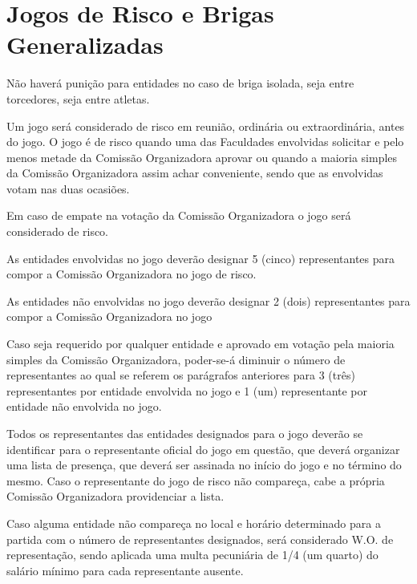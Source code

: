 {\let\clearpage\relax \chapter{Jogos de Risco e Brigas Generalizadas}}

\begin{article}
	Não haverá punição para entidades no caso de briga isolada, seja entre torcedores, seja entre atletas.
\end{article}

\begin{article}
	Um jogo será considerado de risco em reunião, ordinária ou extraordinária, antes do jogo. O jogo é de risco quando uma das Faculdades envolvidas solicitar e pelo menos metade da Comissão Organizadora aprovar ou quando a maioria simples da Comissão Organizadora assim achar conveniente, sendo que as envolvidas votam nas duas ocasiões.

	\begin{xparagraph}
		Em caso de empate na votação da Comissão Organizadora o jogo será considerado de risco.
	\end{xparagraph}

	\begin{xparagraph}
		As entidades envolvidas no jogo deverão designar 5 (cinco) representantes para compor a Comissão Organizadora no jogo de risco.
	\end{xparagraph}

	\begin{xparagraph}
		As entidades não envolvidas no jogo deverão designar 2 (dois) representantes para compor a Comissão Organizadora no jogo
	\end{xparagraph}

	\begin{xparagraph}
		Caso seja requerido por qualquer entidade e aprovado em votação pela maioria simples da Comissão Organizadora, poder-se-á diminuir o número de representantes ao qual se referem os parágrafos anteriores para 3 (três) representantes por entidade envolvida no jogo e 1 (um) representante por entidade não envolvida no jogo.
	\end{xparagraph}

	\begin{xparagraph}
		Todos os representantes das entidades designados para o jogo deverão se identificar para o representante oficial do jogo em questão, que deverá organizar uma lista de presença, que deverá ser assinada no início do jogo e no término do mesmo. Caso o representante do jogo de risco não compareça, cabe a própria Comissão Organizadora providenciar a lista.
	\end{xparagraph}

	\begin{xparagraph}
		Caso alguma entidade não compareça no local e horário determinado para a partida com o número de representantes designados, será considerado W.O. de representação, sendo aplicada uma multa pecuniária de 1/4 (um quarto) do salário mínimo para cada representante ausente.
	\end{xparagraph}
\end{article}

